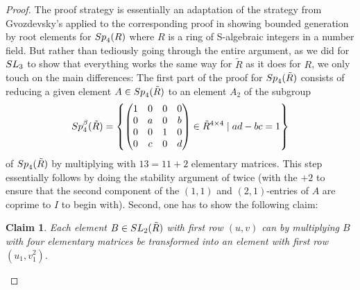 \documentclass[12pt]{amsart}
\newtheorem{claim}{Claim}
\theoremstyle{definition}\newtheorem{definition}[theorem]{Definition}
\theoremstyle{remark}\newtheorem{remark}[theorem]{Remark}
\theoremstyle{definition}\newtheorem{case}{Case}
\begin{document}
\begin{proof}
The proof strategy is essentially an adaptation of the strategy from Gvozdevsky's \cite{gvozdevsky2023width} applied to the corresponding proof in \cite{MR1044049} showing bounded generation by root elements for ${\rm Sp}_4(R)$ where $R$ is a ring of S-algebraic integers in a number field. But rather than tediously going through the entire argument, as we did for ${\rm SL}_3$ to show that everything works the same way for $\tilde{R}$ as it does for $R$, we only touch on the main differences: The first part of the proof for ${\rm Sp}_4(\tilde{R})$ consists of reducing a given element $A\in{\rm Sp}_4(\tilde{R})$ to an element $A_2$ of the subgroup 
\[
{\rm Sp}_4^{\beta}(\tilde{R})=\left\{
\begin{pmatrix}
1 & 0 & 0 & 0\\
0 & a & 0 & b\\
0 & 0 & 1 & 0\\
0 & c & 0 & d
\end{pmatrix}\in\tilde{R}^{4\times 4}\mid ad-bc=1
\right\}
\]
of ${\rm Sp}_4(\tilde{R})$ by multiplying with $13=11+2$ elementary matrices. This step essentially follows by doing the stability argument of \cite[P.109]{MR1044049} twice (with the $+2$ to ensure that the second component of the $(1,1)$ and $(2,1)$-entries of $A$ are coprime to $I$ to begin with). Second, one has to show the following claim:

\begin{claim}\label{square_claim}
Each element $B\in{\rm SL}_2(\tilde{R})$ with first row $(u,v)$ can by multiplying $B$ with four elementary matrices be transformed into an element with first row $(u_1,v_1^2).$
\end{claim}


\end{proof}
\end{document}

